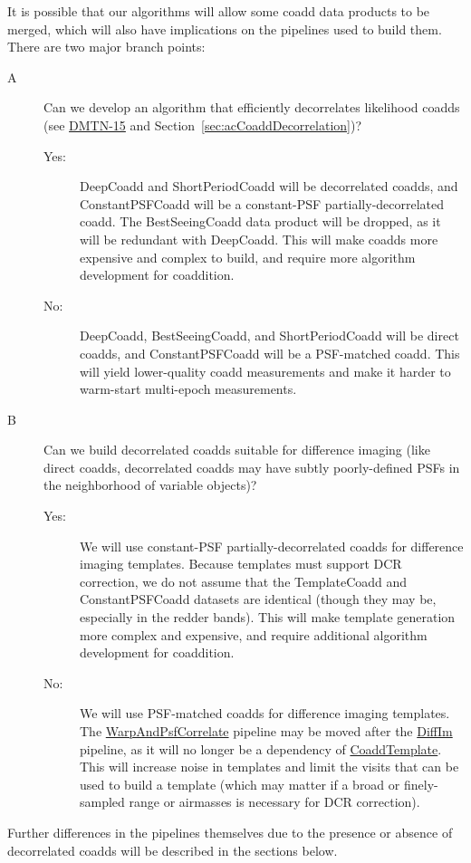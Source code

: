 It is possible that our algorithms will allow some coadd data products to be merged, which will also have implications on the pipelines used to build them.  There are two major branch points:
\begin{description}
\item[A] Can we develop an algorithm that efficiently decorrelates likelihood coadds (see \href{http://dmtn-015.lsst.io/en/latest/}{DMTN-15} and Section~\ref{sec:acCoaddDecorrelation})?
  \begin{description}
  \item[Yes:] DeepCoadd and ShortPeriodCoadd will be decorrelated coadds, and ConstantPSFCoadd will be a constant-PSF partially-decorrelated coadd.  The BestSeeingCoadd data product will be dropped, as it will be redundant with DeepCoadd.  This will make coadds more expensive and complex to build, and require more algorithm development for coaddition.
  \item[No:] DeepCoadd, BestSeeingCoadd, and ShortPeriodCoadd will be direct coadds, and ConstantPSFCoadd will be a PSF-matched coadd.  This will yield lower-quality coadd measurements and make it harder to warm-start multi-epoch measurements.
  \end{description}
\item[B] Can we build decorrelated coadds suitable for difference imaging (like direct coadds, decorrelated coadds may have subtly poorly-defined PSFs in the neighborhood of variable objects)?
  \begin{description}
  \item[Yes:] We will use constant-PSF partially-decorrelated coadds for difference imaging templates.  Because templates must support DCR correction, we do not assume that the TemplateCoadd and ConstantPSFCoadd datasets are identical (though they may be, especially in the redder bands).  This will make template generation more complex and expensive, and require additional algorithm development for coaddition.
  \item[No:] We will use PSF-matched coadds for difference imaging templates.  The \hyperref[sec:drpWarpAndPsfCorrelate]{WarpAndPsfCorrelate} pipeline may be moved after the \hyperref[sec:drpDiffIm]{DiffIm} pipeline, as it will no longer be a dependency of \hyperref[sec:drpCoaddTemplate]{CoaddTemplate}.  This will increase noise in templates and limit the visits that can be used to build a template (which may matter if a broad or finely-sampled range or airmasses is necessary for DCR correction).
  \end{description}
\end{description}
Further differences in the pipelines themselves due to the presence or absence of decorrelated coadds will be described in the sections below.

